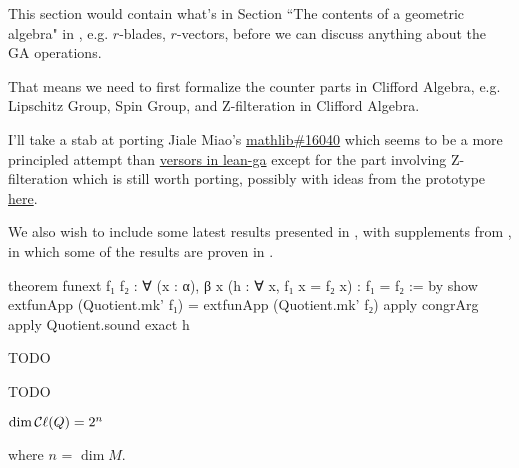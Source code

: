 This section would contain what's in Section ``The contents of a geometric algebra" in \cite{chisolm2012geometric}, e.g. $r$-blades, $r$-vectors, before we can discuss anything about the GA operations.

That means we need to first formalize the counter parts in Clifford Algebra, e.g. Lipschitz Group, Spin Group, and Z-filteration in Clifford Algebra.

I'll take a stab at porting Jiale Miao's \href{https://github.com/leanprover-community/mathlib/pull/16040}{mathlib\#16040} which seems to be a more principled attempt than \href{https://github.com/pygae/lean-ga/blob/master/src/geometric_algebra/from_mathlib/versors.lean}{versors in lean-ga} except for the part involving Z-filteration which is still worth porting, possibly with ideas from the prototype \href{https://github.com/eric-wieser/lftcm2023-clifford_algebra/}{here}.


We also wish to include some latest results presented in \cite{ruhe2023clifford}, with supplements from \cite{brehmer2023geometric},
in which some of the results are proven in \cite{roelfs2023graded}.

\begin{leancode}
theorem funext {f₁ f₂ : ∀ (x : α), β x} (h : ∀ x, f₁ x = f₂ x) : f₁ = f₂ := by
    show extfunApp (Quotient.mk' f₁) = extfunApp (Quotient.mk' f₂)
    apply congrArg
    apply Quotient.sound
    exact h
\end{leancode}

\begin{definition}
    \label{Lipschitz}
    \tangled

    TODO

\end{definition}

\begin{definition}
    \label{SpinGroup}
    \tangled

    TODO

\end{definition}

\begin{theorem}
    \label{dim}
    \tangled

    $\dim \mathop{\mathcal{C}\ell}(Q) = 2^n$

    where $n$ = $\dim M$.

\end{theorem}
